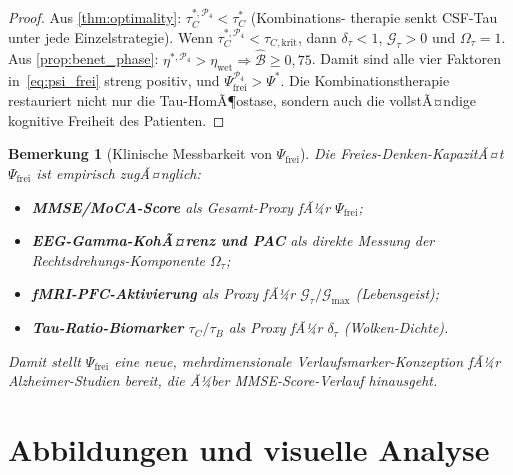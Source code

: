 ﻿\documentclass[12pt,a4paper]{article}
\newtheorem{remark}[theorem]{Bemerkung}
\theoremstyle{definition}
\begin{document}
	\begin{proof}
		Aus \cref{thm:optimality}: $\tau_C^{*,\mathcal{P}_4} < \tau_C^*$ (Kombinations-
		therapie senkt CSF-Tau unter jede Einzelstrategie). Wenn $\tau_C^{*,\mathcal{P}_4} <
		\tau_{C,\mathrm{krit}}$, dann $\delta_\tau < 1$, $\mathcal{G}_\tau > 0$ und
		$\Omega_\tau = 1$. Aus \cref{prop:benet_phase}: $\eta^{*,\mathcal{P}_4} > \eta_{\mathrm{wet}}
		\Rightarrow \hat{\mathcal{B}} \geq 0{,}75$.
		Damit sind alle vier Faktoren in~\eqref{eq:psi_frei} streng positiv,
		und $\Psi_{\mathrm{frei}}^{\mathcal{P}_4} > \Psi^*$. Die Kombinations\-therapie
		restauriert nicht nur die Tau-HomÃ¶ostase, sondern auch die vollstÃ¤ndige kognitive
		Freiheit des Patienten.
	\end{proof}

	\begin{remark}[Klinische Messbarkeit von $\Psi_{\mathrm{frei}}$]
		Die Freies-Denken-KapazitÃ¤t $\Psi_{\mathrm{frei}}$ ist empirisch zugÃ¤nglich:
		\begin{itemize}
			\item \textbf{MMSE/MoCA-Score} als Gesamt-Proxy fÃ¼r $\Psi_{\mathrm{frei}}$;
			\item \textbf{EEG-Gamma-KohÃ¤renz und PAC} als direkte Messung der
			      Rechtsdrehungs-Komponente $\Omega_\tau$;
			\item \textbf{fMRI-PFC-Aktivierung} als Proxy fÃ¼r
			      $\mathcal{G}_\tau/\mathcal{G}_{\max}$ (Lebensgeist);
			\item \textbf{Tau-Ratio-Biomarker} $\tau_C/\tau_B$ als Proxy fÃ¼r
			      $\delta_\tau$ (Wolken-Dichte).
		\end{itemize}
		Damit stellt $\Psi_{\mathrm{frei}}$ eine neue, mehrdimensionale Verlaufsmarker-Konzeption
		fÃ¼r Alzheimer-Studien bereit, die Ã¼ber MMSE-Score-Verlauf hinausgeht.
	\end{remark}

	\section{Abbildungen und visuelle Analyse}
	
\end{document}
